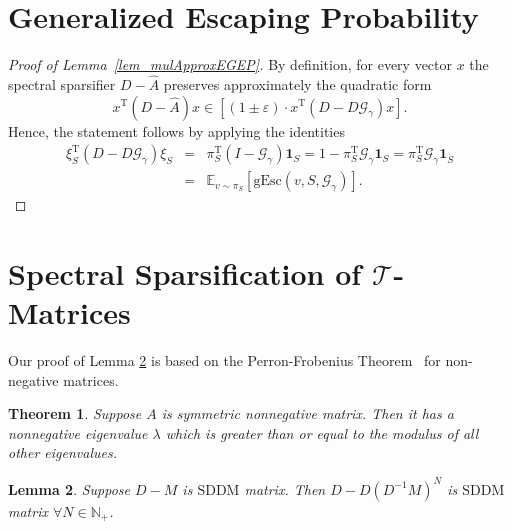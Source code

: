 \documentclass[11pt]{article}
\newcommand{\SDDM}{\mathrm{SDDM}}
\newcommand{\GL}{\mathcal{T}}
\newcommand{\mGg}{\mathcal{G}_{\gamma}}
\newcommand{\hA}{\widehat{A}}
\newcommand{\Di}{D^{-1}}
\newcommand{\N}{\mathbb{N}}
\newcommand{\rot}{\mathrm{T}}
\newcommand{\eps}{\epsilon}
\renewcommand{\eps}{\varepsilon}
\newtheorem{thm}{Theorem}  \newtheorem{fact}[thm]{Fact}
\newtheorem{lem}[thm]{Lemma}
\numberwithin{thm}{section}
\newcommand{\mat}[1]{\boldsymbol{\mathbf{#1}}}
\begin{document}













\appendix

\section{Generalized Escaping Probability}\label{appsec:GenEscProb}

\begin{proof}[Proof of Lemma~\ref{lem_mulApproxEGEP}]
By definition, for every vector $x$ the spectral sparsifier $D-\hA$ preserves approximately the quadratic form
\[
x^{\rot}(D-\hA)x\in[(1\pm\eps)\cdot x^{\rot}(D-D\mGg)x].
\]
Hence, the statement follows by applying the identities
\begin{eqnarray*}
\xi_{S}^{\rot}(D-D\mGg)\xi_{S} & = & \pi_{S}^{\rot}(I-\mGg)\mat{1}_{S} = 1-\pi_{S}^{\rot}\mGg\mat{1}_{S} = \pi_{S}^{\rot}\mGg\mat{1}_{\overline{S}}\\
 & = & \mathbb{E}_{v\sim\pi_{S}}\left[\mathrm{gEsc}(v,S,\mGg)\right].
\end{eqnarray*}
\end{proof}



\section{Spectral Sparsification of $\GL$-Matrices}\label{appsec:GLM}


Our proof of Lemma \ref{lem_SDDM_Closure} is based on the Perron-Frobenius Theorem~\cite{M73} for non-negative matrices.

\begin{thm}\label{thm_PF_NNM}\cite[Perron-Frobenius]{M73}
Suppose $A$ is symmetric nonnegative matrix. Then it has a nonnegative eigenvalue $\lambda$ which is greater than or equal to the modulus of all other eigenvalues.
\end{thm}

\begin{lem}\label{lem_SDDM_Closure}
Suppose $D-M$ is $\SDDM$ matrix. Then $D-D(\Di M)^{N}$ is $\SDDM$ matrix $\forall N\in\N_{+}$.
\end{lem}
\end{document}

